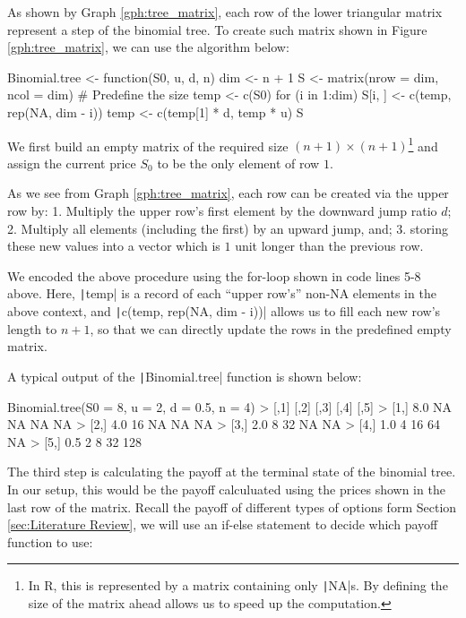 As shown by Graph \ref{gph:tree_matrix}, each row of the lower triangular matrix represent a step of the binomial tree. To create such matrix shown in Figure \ref{gph:tree_matrix}, we can use the algorithm below:

\begin{Rminted}
Binomial.tree <- function(S0, u, d, n) {
    dim <- n + 1
    S <- matrix(nrow = dim, ncol = dim) # Predefine the size
    temp <- c(S0)
    for (i in 1:dim) {
        S[i, ] <- c(temp, rep(NA, dim - i))
        temp <- c(temp[1] * d, temp * u)
    }
    S
}
\end{Rminted}

We first build an empty matrix of the required size $(n+1)\times(n+1)$\footnote{In R, this is represented by a matrix containing only \texttt|NA|s. By defining the size of the matrix ahead allows us to speed up the computation.} and assign the current price $S_0$ to be the only element of row $1$.

As we see from Graph \ref{gph:tree_matrix}, each row can be created via the upper row by: 1. Multiply the upper row's first element by the downward jump ratio $d$; 2. Multiply all elements (including the first) by an upward jump, and; 3. storing these new values into a vector which is $1$ unit longer than the previous row.

We encoded the above procedure using the for-loop shown in code lines 5-8 above. Here, \texttt|temp| is a record of each ``upper row's'' non-NA elements in the above context, and \texttt|c(temp, rep(NA, dim - i))| allows us to fill each new row's length to $n+1$, so that we can directly update the rows in the predefined empty matrix.

A typical output of the \texttt|Binomial.tree| function is shown below:

\begin{Rminted}
Binomial.tree(S0 = 8, u = 2, d = 0.5, n = 4)
>      [,1] [,2] [,3] [,4] [,5]
> [1,]  8.0   NA   NA   NA   NA
> [2,]  4.0   16   NA   NA   NA
> [3,]  2.0    8   32   NA   NA
> [4,]  1.0    4   16   64   NA
> [5,]  0.5    2    8   32  128
\end{Rminted}

The third step is calculating the payoff at the terminal state of the binomial tree. In our setup, this would be the payoff calculuated using the prices shown in the last row of the matrix. Recall the payoff of different types of options form Section \ref{sec:Literature Review}, we will use an if-else statement to decide which payoff function to use:

